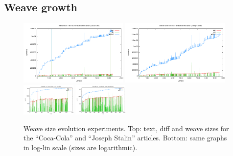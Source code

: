 \documentclass{acm_proc_article-sp}
\begin{document}
\subsection{Weave growth}

\begin{figure} 
\includegraphics[width=0.48\textwidth]{cocacola-weave_vs_text-linscale.pdf}
\includegraphics[width=0.48\textwidth]{stalin-weave_vs_text-linscale.pdf}
\includegraphics[width=0.24\textwidth]{cocacola-weave_vs_text-logscale.pdf}
\includegraphics[width=0.24\textwidth]{stalin-weave_vs_text-logscale.pdf}
\caption{Weave size evolution experiments. Top: text, diff and weave sizes for the ``Coca-Cola'' and ``Joseph Stalin'' articles. Bottom: same graphs in log-lin scale (sizes are logarithmic).} \label{fig:weave}
\end{figure}
\end{document}
